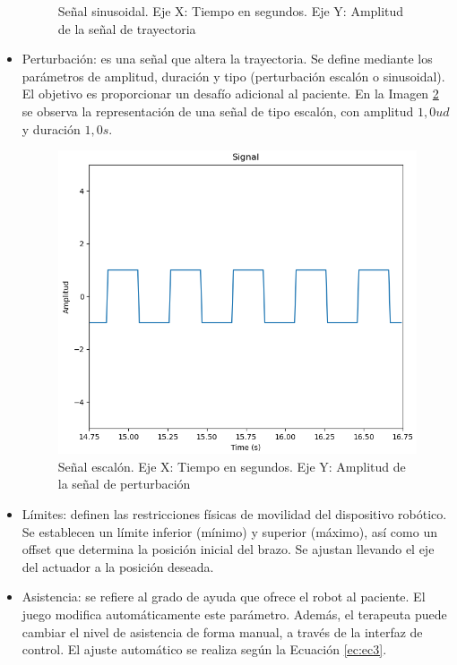 \begin{itemize}
\begin{figure}[ht!]
		\caption[Trayectoria dinámica de tipo seno]{Señal sinusoidal. Eje X: Tiempo en segundos. Eje Y: Amplitud de la señal de trayectoria}
		\label{fig:trajectory}
	\end{figure}
	\item Perturbación: es una señal que altera la trayectoria. Se define mediante los parámetros de amplitud, duración y tipo (perturbación escalón o sinusoidal). El objetivo es proporcionar un desafío adicional al paciente.
	En la Imagen \ref{fig:perturbacion} se observa la representación de una señal de tipo escalón, con amplitud $1,0 ud$ y duración $1,0 s$.
	\begin{figure}[ht!]
		\centering
		\begin{minipage}{0.65\linewidth}
			\centering
			\includegraphics[width=\linewidth]{figs/perturbacion.png}
		\end{minipage}
		\caption[Perturbación de tipo escalón]{Señal escalón. Eje X: Tiempo en segundos. Eje Y: Amplitud de la señal de perturbación}
		\label{fig:perturbacion}
	\end{figure}
	\item Límites: definen las restricciones físicas de movilidad del dispositivo robótico. Se establecen un límite inferior (mínimo) y superior (máximo), así como un offset que determina la posición inicial del brazo. Se ajustan llevando el eje del actuador a la posición deseada.
	\item Asistencia: se refiere al grado de ayuda que ofrece el robot al paciente. El juego modifica automáticamente este parámetro. Además, el terapeuta puede cambiar el nivel de asistencia de forma manual, a través de la interfaz de control. El ajuste automático se realiza según la Ecuación \ref{ec:ec3}.

\end{itemize}
